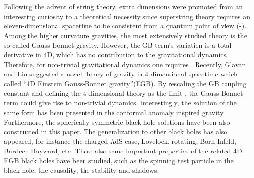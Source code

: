 \documentclass[aps,11pt]{revtex4}
\begin{document}
Following the advent of string theory, extra dimensions were promoted from an
interesting curiosity to a theoretical necessity since superstring theory requires an eleven-dimensional spacetime to be consistent from a quantum point of view (\cite{Horava:1996ma}-\cite{Randall:1999vf}). Among the higher curvature gravities, the most extensively studied theory is the so-called Gauss-Bonnet gravity. However, the GB term's variation is a total derivative in 4D, which has no contribution to the gravitational dynamics. Therefore, for non-trivial gravitational dynamics one requires . Recently, Glavan and Lin \cite{Glavan:2019inb} suggested a novel theory of gravity in 4-dimensional spacetime which called ``4D Einstein Gauss-Bonnet gravity''(EGB). By rescaling the GB coupling constant  and defining the 4-dimensional theory as the limit , the Gauss-Bonnet term could give rise to non-trivial dynamics. Interestingly, the solution of the same form has been presented in the conformal anomaly inspired gravity\cite{Cai:2009ua,Cai:2014jea}.
Furthermore, the spherically symmetric black hole solutions have been also constructed in this paper. The generalization to other black holes has also appeared, for instance the charged AdS case\cite{Fernandes:2020rpa}, Lovelock\cite{Konoplya:2020qqh,Casalino:2020kbt}, rotating\cite{Kumar:2020owy,Ghosh:2020vpc}, Born-Infeld\cite{Yang:2020jno}, Bardeen\cite{Kumar:2020uyz}  Hayward\cite{Kumar:2020xvu}, etc. There also some important properties of the related 4D EGB black holes have been studied, such as the spinning test particle in the black hole\cite{Zhang:2020qew}, the causality\cite{Ge:2020tid}, the stability and shadows\cite{Guo:2020zmf,Wei:2020ght}.
\end{document}
